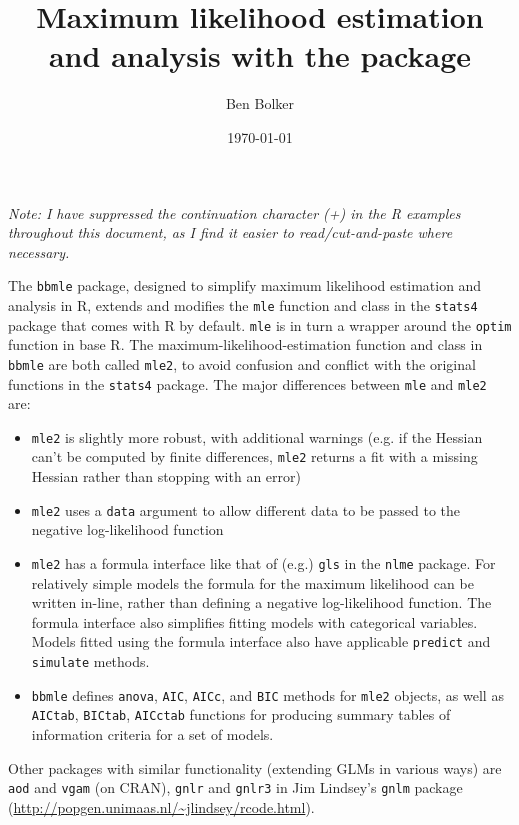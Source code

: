 \documentclass{article}
\author{Ben Bolker}
\title{Maximum likelihood estimation and analysis
  with the \code{bbmle} package}
\date{\today}
\newcommand{\code}[1]{{\tt #1}}
\begin{document}

%
\maketitle
\tableofcontents



\emph{Note: I have suppressed the continuation character (+) in
  the R examples throughout this document, 
  as I find it easier to read/cut-and-paste where
  necessary.}

The \code{bbmle} package, designed to simplify
maximum likelihood estimation and analysis in R,
extends and modifies the \code{mle} function and class
in the \code{stats4} package that comes with R by default.
\code{mle} is in turn a wrapper around the \code{optim}
function in base R.
The maximum-likelihood-estimation function and class
in \code{bbmle} are both called \code{mle2}, to avoid
confusion and conflict with the original functions in
the \code{stats4} package.  The major differences between
\code{mle} and \code{mle2} are:
\begin{itemize}
\item \code{mle2} is slightly
   more robust, with additional warnings (e.g.
  if the Hessian can't be computed by finite differences,
  \code{mle2} returns a fit with a missing Hessian rather
  than stopping with an error)
\item \code{mle2} uses a \code{data} argument to allow different
  data to be passed to the negative log-likelihood function
\item \code{mle2} has a formula interface like that
 of (e.g.) \code{gls} in the \code{nlme} package.
  For relatively simple models the formula for the
  maximum likelihood can be written in-line, rather than
  defining a negative log-likelihood function.  The formula
  interface also simplifies fitting models with
  categorical variables.  Models fitted using the formula interface
  also have applicable \code{predict} and \code{simulate} methods.
\item \code{bbmle} defines \code{anova}, \code{AIC}, \code{AICc}, 
  and \code{BIC} methods for
  \code{mle2} objects, as well as
  \code{AICtab}, \code{BICtab}, \code{AICctab}
  functions for producing summary tables of information criteria for a 
  set of models.
\end{itemize}

Other packages with similar functionality (extending
GLMs in various ways) are \code{aod} and \code{vgam} (on CRAN), 
\code{gnlr} and \code{gnlr3} in Jim Lindsey's \code{gnlm} package
(\url{http://popgen.unimaas.nl/~jlindsey/rcode.html}).
\end{document}
